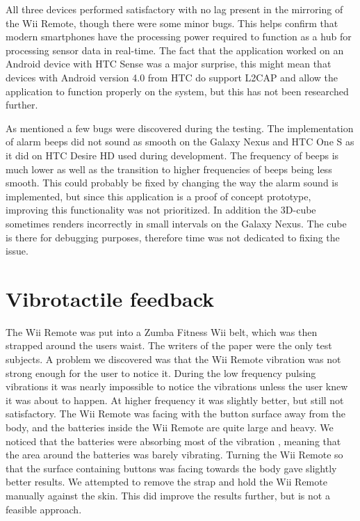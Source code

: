 All three devices performed satisfactory with no lag present in the mirroring of the Wii Remote, though there were some minor bugs. This helps confirm that modern smartphones have the processing power required to function as a hub for processing sensor data in real-time. The fact that the application worked on an Android device with HTC Sense was a major surprise, this might mean that devices with Android version 4.0 from HTC do support L2CAP and allow the application to function properly on the system, but this has not been researched further.

As mentioned a few bugs were discovered during the testing. The implementation of alarm beeps did not sound as smooth on the Galaxy Nexus and HTC One S as it did on HTC Desire HD used during development. The frequency of beeps is much lower as well as the transition to higher frequencies of beeps being less smooth. This could probably be fixed by changing the way the alarm sound is implemented, but since this application is a proof of concept prototype, improving this functionality was not prioritized. In addition the 3D-cube sometimes renders incorrectly in small intervals on the Galaxy Nexus. The cube is there  for debugging purposes, therefore time was not dedicated to fixing the issue.

\section{Vibrotactile feedback}
The Wii Remote was put into a Zumba Fitness Wii belt, which was then strapped around the users waist. The writers of the paper were the only test subjects. A problem we discovered was that the Wii Remote vibration was not strong enough for the user to notice it. During the low frequency pulsing vibrations it was nearly impossible to notice the vibrations unless the user knew it was about to happen. At higher frequency it was slightly better, but still not satisfactory. The Wii Remote was facing with the button surface away from the body, and the batteries inside the Wii Remote are quite large and heavy. We noticed that the batteries were absorbing most of the vibration , meaning that the area around the batteries was barely vibrating. Turning the Wii Remote so that the surface containing buttons was facing towards the body gave slightly better results. We attempted to remove the strap and hold the Wii Remote manually against the skin. This did improve the results further, but is not a feasible approach.
